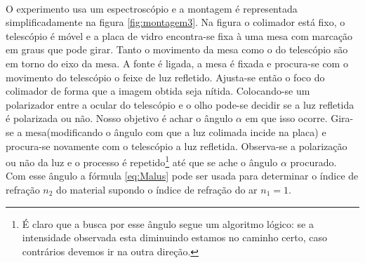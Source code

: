 \documentclass[a4paper,11pt]{article}
\begin{document}
		\paragraph{}O experimento usa um espectroscópio e a montagem é representada simplificadamente na figura \ref{fig:montagem3}. Na figura o colimador está fixo, o telescópio é móvel e a placa de vidro encontra-se fixa à uma mesa com marcação em graus que pode girar. Tanto o movimento da mesa como o do telescópio são em torno do eixo da mesa. A fonte é ligada, a mesa é fixada e procura-se com o movimento do telescópio o feixe de luz refletido. Ajusta-se então o foco do colimador de forma que a imagem obtida seja nítida. Colocando-se um polarizador  entre a ocular do telescópio e o olho pode-se decidir se a luz refletida é polarizada ou não. Nosso objetivo é achar o ângulo $\alpha$ em que isso ocorre. Gira-se a mesa(modificando o ângulo com que a luz colimada incide na placa) e procura-se novamente com o telescópio a luz refletida. Observa-se a polarização ou não da luz e o processo é repetido\footnote{É claro que a busca por esse ângulo segue um algoritmo lógico: se a intensidade observada esta diminuindo estamos no caminho certo, caso contrários devemos ir na outra direção.} até que se ache o ângulo $\alpha$ procurado. Com esse ângulo a fórmula \ref{eq:Malus} pode ser usada para determinar o índice de refração $n_2$ do material supondo o índice de refração do ar $n_1 = 1$. 
		
\end{document}
